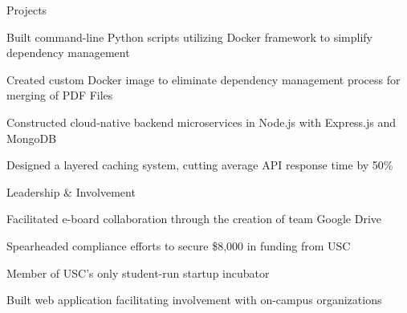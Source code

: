 \documentclass{resume} %
\begin{document}

\begin{rSection}{Projects}

\begin{rList}
\item Built command-line Python scripts utilizing Docker framework to simplify 
    dependency management
\item Created custom Docker image to eliminate dependency management process for
    merging of PDF Files
\end{rList}
\vspace{0.5em}


\begin{rList}
\item Constructed cloud-native backend microservices in Node.js with Express.js
    and MongoDB
\item Designed a layered caching system, cutting average API response time by
    50\%
\end{rList}
\vspace{0.5em}

\end{rSection}


\begin{rSection}{Leadership \& Involvement}

\company{\uscih}{\la}
\begin{rList}
\item Facilitated e-board collaboration through the creation of team Google Drive
\item Spearheaded compliance efforts to secure \$8,000 in funding from USC
\end{rList}
\vspace{0.5em}


\company{\lavalab}{\la}
\begin{rList}
\item Member of USC's only student-run startup incubator
\item Built web application facilitating involvement with on-campus 
    organizations
\end{rList}

\end{rSection}

\end{document}
